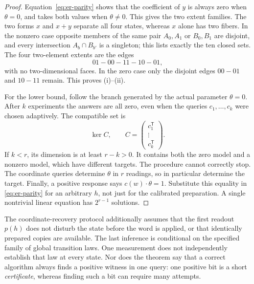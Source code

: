 \documentclass[11pt]{article}
\theoremstyle{definition}
\begin{document}
\begin{proof}
Equation~\eqref{eq:er-parity} shows that the coefficient of $y$ is always
zero when $\theta=0$, and takes both values when $\theta\ne0$. This gives
the two extent families. The two forms $x$ and $x+y$ separate all four
states, whereas $x$ alone has two fibers. In the nonzero case opposite
members of the same pair $A_0,A_1$ or $B_0,B_1$ are disjoint, and every
intersection $A_b\cap B_{b'}$ is a singleton; this lists exactly the ten
closed sets. The four two-element extents are the edges
\[
 01-00-11-10-01,
\]
with no two-dimensional faces. In the zero case only the disjoint edges
$00-01$ and $10-11$ remain. This proves (i)--(ii).

For the lower bound, follow the branch generated by the actual parameter
$\theta=0$. After $k$ experiments the answers are all zero, even when the
queries $c_1,\ldots,c_k$ were chosen adaptively. The compatible set is
\[
 \ker C,\qquad
 C=\begin{pmatrix}c_1^\mathsf T\\ \vdots\\c_k^\mathsf T\end{pmatrix}.
\]
If $k<r$, its dimension is at least $r-k>0$. It contains both the zero model
and a nonzero model, which have different targets. The procedure cannot
correctly stop. The coordinate queries determine $\theta$ in $r$ readings,
so in particular determine the target. Finally, a positive response says
$c(w)\cdot\theta=1$. Substitute this equality in
\eqref{eq:er-parity} for an arbitrary $h$, not just for the calibrated
preparation. A single nontrivial linear equation has $2^{r-1}$ solutions.
\end{proof}

The coordinate-recovery protocol additionally assumes that the first
readout $p(h)$ does not disturb the state before the word is applied, or
that identically prepared copies are available. The last inference is
conditional on the specified family of global transition laws. One measurement does not independently establish that law
at every state. Nor does the theorem say that a correct algorithm always
finds a positive witness in one query: one positive bit is a short
\emph{certificate}, whereas finding such a bit can require many attempts.
\end{document}
